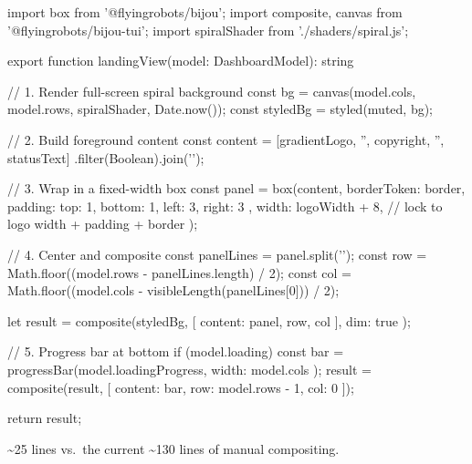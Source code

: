 \begin{CodeBlock}
import { box } from '@flyingrobots/bijou';
import { composite, canvas } from '@flyingrobots/bijou-tui';
import { spiralShader } from './shaders/spiral.js';

export function landingView(model: DashboardModel): string {
  // 1. Render full-screen spiral background
  const bg = canvas(model.cols, model.rows, spiralShader, Date.now());
  const styledBg = styled(muted, bg);

  // 2. Build foreground content
  const content = [gradientLogo, '', copyright, '', statusText]
    .filter(Boolean).join('\n');

  // 3. Wrap in a fixed-width box
  const panel = box(content, {
    borderToken: border,
    padding: { top: 1, bottom: 1, left: 3, right: 3 },
    width: logoWidth + 8, // lock to logo width + padding + border
  });

  // 4. Center and composite
  const panelLines = panel.split('\n');
  const row = Math.floor((model.rows - panelLines.length) / 2);
  const col = Math.floor((model.cols - visibleLength(panelLines[0])) / 2);

  let result = composite(styledBg, [{ content: panel, row, col }], { dim: true });

  // 5. Progress bar at bottom
  if (model.loading) {
    const bar = progressBar(model.loadingProgress, { width: model.cols });
    result = composite(result, [{ content: bar, row: model.rows - 1, col: 0 }]);
  }

  return result;
}
\end{CodeBlock}

\textasciitilde25 lines vs.~the current \textasciitilde130 lines of manual compositing.

